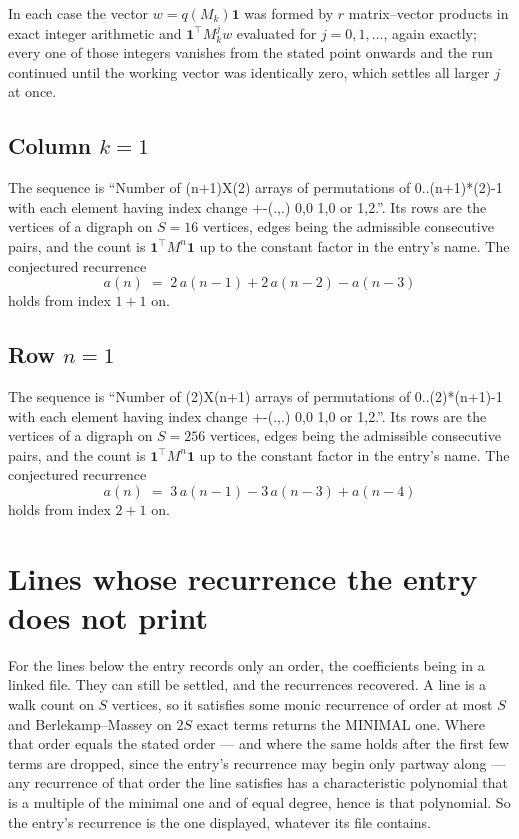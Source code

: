 \documentclass[11pt,a4paper]{article}
\theoremstyle{plain}
\theoremstyle{definition}
\begin{document}
In each case the vector $w=q(M_k)\mathbf{1}$ was formed by $r$ matrix--vector products in
exact integer arithmetic and $\mathbf{1}^{\!\top}M_k^{j}w$ evaluated for $j=0,1,\dots$,
again exactly; every one of those integers vanishes from the stated point onwards and the run
continued until the working vector was identically zero, which settles all larger $j$ at once.

\subsection*{Column $k$$=1$}
The sequence is ``Number of (n+1)X(2) arrays of permutations of 0..(n+1)*(2)-1 with each element having index change +-(.,.) 0,0 1,0 or 1,2.''. Its rows are the vertices of a digraph on
$S=16$ vertices, edges being the admissible consecutive pairs, and the count is
$\mathbf{1}^{\!\top}M^{n}\mathbf{1}$ up to the constant factor in the entry's name.
The conjectured recurrence
\[
a(n)\;=\;2\,a(n-1) + 2\,a(n-2) - a(n-3)
\]
holds from index $1+1$ on.

\subsection*{Row $n$$=1$}
The sequence is ``Number of (2)X(n+1) arrays of permutations of 0..(2)*(n+1)-1 with each element having index change +-(.,.) 0,0 1,0 or 1,2.''. Its rows are the vertices of a digraph on
$S=256$ vertices, edges being the admissible consecutive pairs, and the count is
$\mathbf{1}^{\!\top}M^{n}\mathbf{1}$ up to the constant factor in the entry's name.
The conjectured recurrence
\[
a(n)\;=\;3\,a(n-1) - 3\,a(n-3) + a(n-4)
\]
holds from index $2+1$ on.


\section{Lines whose recurrence the entry does not print}

For the lines below the entry records only an order, the coefficients being in a linked file.
They can still be settled, and the recurrences recovered. A line is a walk count on $S$
vertices, so it satisfies some monic recurrence of order at most $S$ and Berlekamp--Massey on
$2S$ exact terms returns the MINIMAL one. Where that order equals the stated order --- and
where the same holds after the first few terms are dropped, since the entry's recurrence may
begin only partway along --- any recurrence of that order the line satisfies has a
characteristic polynomial that is a multiple of the minimal one and of equal degree, hence is
that polynomial. So the entry's recurrence is the one displayed, whatever its file contains.
\end{document}
